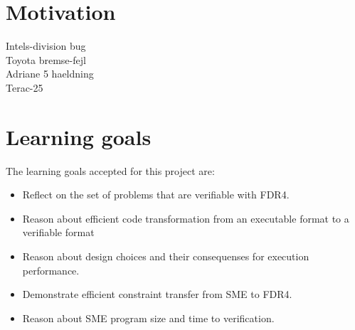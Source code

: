 \documentclass[a4paper]{report}
\begin{document}
\section{Motivation}
Intels-division bug \\
Toyota bremse-fejl\\
Adriane 5 haeldning\\
Terac-25\\
\section{Learning goals}
The learning goals accepted for this project are:
\begin{itemize}
\item Reflect on the set of problems that are verifiable with FDR4.
\item Reason about efficient code transformation from an executable format to a verifiable format
\item Reason about design choices and their consequenses for execution performance.
\item Demonstrate efficient constraint transfer from SME to FDR4.
\item Reason about SME program size and time to verification. 
\end{itemize}
\end{document}
